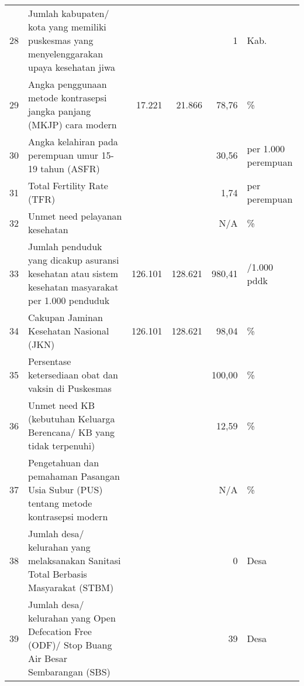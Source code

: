 \begin{center}
\begin{longtable}{rY{12em}rrrY{6em}}
                   28 & Jumlah kabupaten/ kota yang memiliki puskesmas yang menyelenggarakan upaya kesehatan jiwa                                      &         &         &        1 & Kab.                \\
                   29 & Angka penggunaan metode kontrasepsi jangka panjang (MKJP) cara modern                                                          &  17.221 &  21.866 &    78,76 & \%                  \\
                   30 & Angka kelahiran pada perempuan umur 15-19 tahun (ASFR)                                                                         &         &         &    30,56 & per 1.000 perempuan \\
                   31 & Total Fertility Rate (TFR)                                                                                                     &         &         &     1,74 & per perempuan       \\
                   32 & Unmet need pelayanan kesehatan                                                                                                 &         &         &      N/A & \%                  \\
                   33 & Jumlah penduduk yang dicakup asuransi kesehatan atau sistem kesehatan masyarakat per 1.000 penduduk                            & 126.101 & 128.621 &   980,41 & /1.000 pddk         \\
                   34 & Cakupan Jaminan Kesehatan Nasional (JKN)                                                                                       & 126.101 & 128.621 &    98,04 & \%                  \\
                   35 & Persentase ketersediaan obat dan vaksin di Puskesmas                                                                           &         &         &   100,00 & \%                  \\
                   36 & Unmet need KB (kebutuhan Keluarga Berencana/ KB yang tidak terpenuhi)                                                          &         &         & 12,59 & \%                  \\
                   37 & Pengetahuan dan pemahaman Pasangan Usia Subur (PUS) tentang metode kontrasepsi modern                                          &         &         & N/A & \%                  \\
                   38 & Jumlah desa/ kelurahan yang melaksanakan Sanitasi Total Berbasis Masyarakat (STBM)                                             &         &         &        0 & Desa                \\
                   39 & Jumlah desa/ kelurahan yang Open Defecation Free (ODF)/ Stop Buang Air Besar Sembarangan (SBS)                                 &         &         &       39 & Desa \\
\bottomrule
\end{longtable}
\par\end{center}


